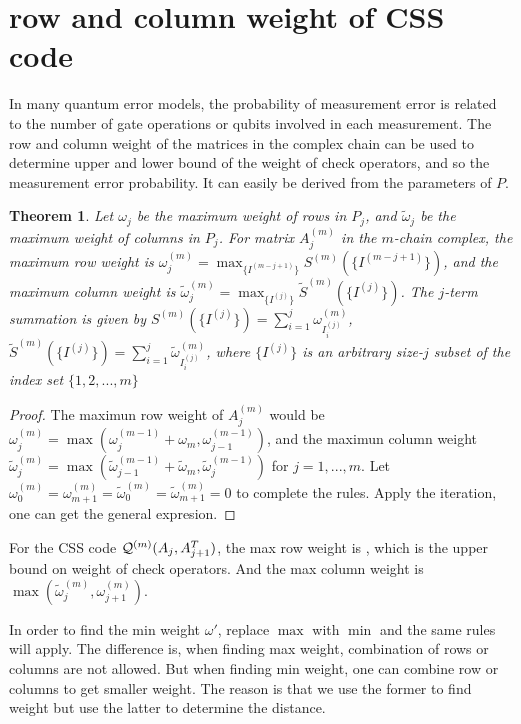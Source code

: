 \documentclass[aps,prb,12pt,tightenlines,%
notitlepage,longbibliography]{revtex4-1}
\newtheorem{theorem}{Theorem}
\begin{document}
\section{row and column weight of CSS code}
In many quantum error models, the probability of measurement error is related to the number of gate operations or qubits involved in each measurement. The row and column weight of the matrices in the complex chain can be used to determine upper and lower bound of the weight of check operators, and so the measurement error probability. It can easily be derived from the parameters of $P$.

\begin{theorem}
Let $\omega_j$ be the maximum weight of rows in $P_j$, and $\tilde\omega_j$ be the maximum weight of columns in $P_j$.
For matrix $A^{(m)}_j$ in the $m$-chain complex, the maximum row weight is $\displaystyle \omega^{(m)}_j=\max_{\{I^{(m-j+1)}\}} S^{(m)}(\{I^{(m-j+1)}\})$, and the maximum column weight is
$\displaystyle \tilde\omega^{(m)}_j=\max_{\{I^{(j)}\}} \tilde S^{(m)}(\{I^{(j)}\}) $. The $j$-term summation is given by $\displaystyle  S^{(m)}(\{I^{(j)}\}) = \sum_{i=1}^{j}  \omega^{(m)}_{I^{(j)}_i}$, $\displaystyle \tilde S^{(m)}(\{I^{(j)}\}) = \sum_{i=1}^{j} \tilde \omega^{(m)}_{I^{(j)}_i}$, where $\{I^{(j)}\}$ is an arbitrary size-$j$ subset of the index set $\{1,2,...,m\}$

\end{theorem}
\begin{proof}
The maximun row weight of $A^{(m)}_j$ would be  $\omega^{(m)}_j=\max( \omega^{(m-1)}_j+\omega_m,\omega^{(m-1)}_{j-1})$, and the maximun column weight $\tilde\omega^{(m)}_j=\max( \tilde\omega^{(m-1)}_{j-1}+\tilde\omega_m,\tilde\omega^{(m-1)}_{j})$ for $j=1,...,m$. Let $\omega^{(m)}_0=\omega^{(m)}_{m+1}=\tilde\omega^{(m)}_0=\tilde\omega^{(m)}_{m+1}=0$ to complete the rules.
Apply the iteration, one can get the general expresion.
\end{proof}

For the CSS code $ {{\cal Q}^{(m)}}(A_{j},A_{j+1}^T)$, the max row weight is , which is the upper bound on weight of check operators. And the max column weight is $\max( \tilde\omega^{(m)}_j,  \omega^{(m)}_{j+1})$.

In order to find the min weight $\omega'$, replace $\max$ with $\min$ and the same rules will apply. The difference is, when finding max weight, combination of rows or columns are not allowed. But when finding min weight, one can combine row or columns to get smaller weight. The reason is that we use the former to find weight but use the latter to determine the distance.
\end{document}
